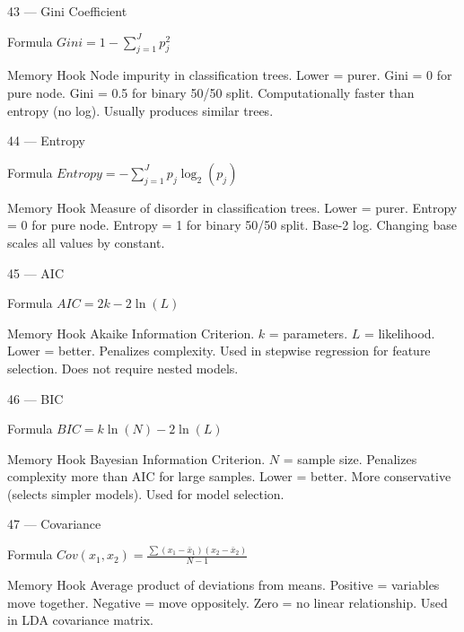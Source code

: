\documentclass[aspectratio=169,8pt]{beamer}
\begin{document}
	\begin{frame}{43 --- Gini Coefficient}
		\begin{block}{Formula}
			$Gini = 1 - \sum_{j=1}^{J} p_j^2$
		\end{block}
		\begin{block}{Memory Hook}
			Node impurity in classification trees. Lower = purer. Gini = 0 for pure node. Gini = 0.5 for binary 50/50 split. Computationally faster than entropy (no log). Usually produces similar trees.
		\end{block}
	\end{frame}
	
	\begin{frame}{44 --- Entropy}
		\begin{block}{Formula}
			$Entropy = -\sum_{j=1}^{J} p_j \log_2(p_j)$
		\end{block}
		\begin{block}{Memory Hook}
			Measure of disorder in classification trees. Lower = purer. Entropy = 0 for pure node. Entropy = 1 for binary 50/50 split. Base-2 log. Changing base scales all values by constant.
		\end{block}
	\end{frame}
	
	\begin{frame}{45 --- AIC}
		\begin{block}{Formula}
			$AIC = 2k - 2\ln(L)$
		\end{block}
		\begin{block}{Memory Hook}
			Akaike Information Criterion. $k$ = parameters. $L$ = likelihood. Lower = better. Penalizes complexity. Used in stepwise regression for feature selection. Does not require nested models.
		\end{block}
	\end{frame}
	
	\begin{frame}{46 --- BIC}
		\begin{block}{Formula}
			$BIC = k\ln(N) - 2\ln(L)$
		\end{block}
		\begin{block}{Memory Hook}
			Bayesian Information Criterion. $N$ = sample size. Penalizes complexity more than AIC for large samples. Lower = better. More conservative (selects simpler models). Used for model selection.
		\end{block}
	\end{frame}
	
	\begin{frame}{47 --- Covariance}
		\begin{block}{Formula}
			$Cov(x_1, x_2) = \frac{\sum(x_1 - \bar{x}_1)(x_2 - \bar{x}_2)}{N-1}$
		\end{block}
		\begin{block}{Memory Hook}
			Average product of deviations from means. Positive = variables move together. Negative = move oppositely. Zero = no linear relationship. Used in LDA covariance matrix.
		\end{block}
	\end{frame}
	
\end{document}

